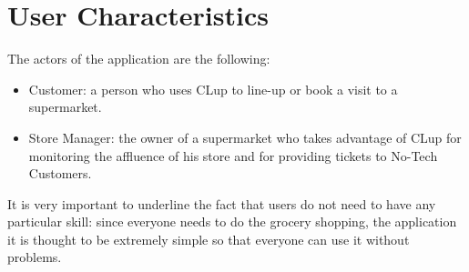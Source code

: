 \section{User Characteristics}

The actors of the application are the following:
\begin{itemize}
	\item Customer: a person who uses CLup to line-up or book a visit to a supermarket.
	\item Store Manager: the owner of a supermarket who takes advantage of CLup for monitoring the affluence of his store and for providing tickets to No-Tech Customers.
\end{itemize} 
It is very important to underline the fact that users do not need to have any particular skill: since everyone needs to do the grocery shopping, the application it is thought to be extremely simple so that everyone can use it without problems.


 
 